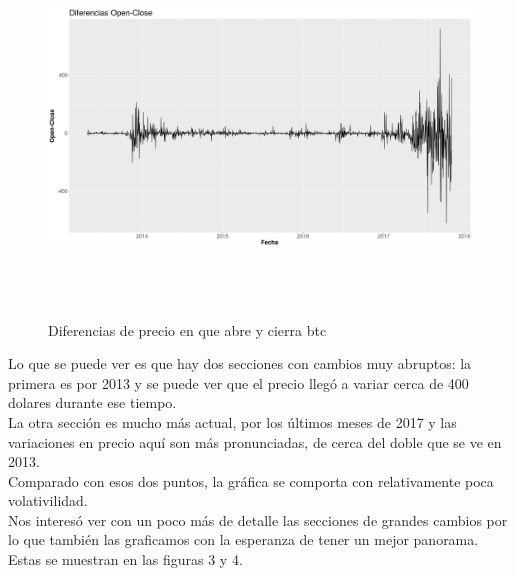 \documentclass[12pt,letterpaper]{article}
\begin{document}
    \begin{figure}
        \centering

        \includegraphics[width = 18cm, height = 10cm]{btc/diferencias_BTC_OpenClose}

        \caption{Diferencias de precio en que abre y cierra btc}
    \end{figure}

    Lo que se puede ver es que hay dos secciones con cambios muy abruptos: la primera es por 2013 y se puede ver que el precio lleg\'o a variar cerca de 400 dolares durante ese tiempo.
    \\
    La otra secci\'on es mucho m\'as actual, por los \'ultimos meses de 2017 y las variaciones en precio aqu\'i son m\'as pronunciadas, de cerca del doble que se ve en 2013.
    \\
    Comparado con esos dos puntos, la gr\'afica se comporta con relativamente poca volativilidad.
    \\
    Nos interes\'o ver con un poco m\'as de detalle las secciones de grandes cambios por lo que tambi\'en las graficamos con la esperanza de tener un mejor panorama. Estas se muestran en las figuras 3 y 4.
    
\end{document}
